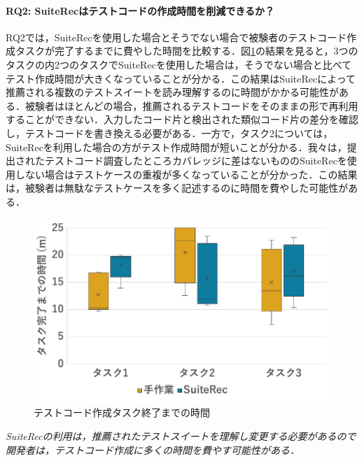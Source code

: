 \documentclass[12pt]{jarticle} %
\begin{document}
\paragraph{RQ2: {\sf SuiteRec}はテストコードの作成時間を削減できるか？}RQ2では，{\sf SuiteRec}を使用した場合とそうでない場合で被験者のテストコード作成タスクが完了するまでに費やした時間を比較する．図\ref{time}の結果を見ると，3つのタスクの内2つのタスクで{\sf SuiteRec}を使用した場合は，そうでない場合と比べてテスト作成時間が大きくなっていることが分かる．この結果は{\sf SuiteRec}によって推薦される複数のテストスイートを読み理解するのに時間がかかる可能性がある．被験者はほとんどの場合，推薦されるテストコードをそのままの形で再利用することができない．入力したコード片と検出された類似コード片の差分を確認し，テストコードを書き換える必要がある．一方で，タスク2については，{\sf SuiteRec}を利用した場合の方がテスト作成時間が短いことが分かる．我々は，提出されたテストコード調査したところカバレッジに差はないものの{\sf SuiteRec}を使用しない場合はテストケースの重複が多くなっていることが分かった．この結果は，被験者は無駄なテストケースを多く記述するのに時間を費やした可能性がある．


\begin{figure}[htbp]
  \begin{center}
   \includegraphics[width=12cm]{pic/time.pdf}
  \caption{テストコード作成タスク終了までの時間}
  \label{time}
  \end{center}
\end{figure}

\begin{breakbox}
\textit{{\sf SuiteRec}の利用は，推薦されたテストスイートを理解し変更する必要があるので開発者は，テストコード作成に多くの時間を費やす可能性がある．}
\end{breakbox}
\end{document}
